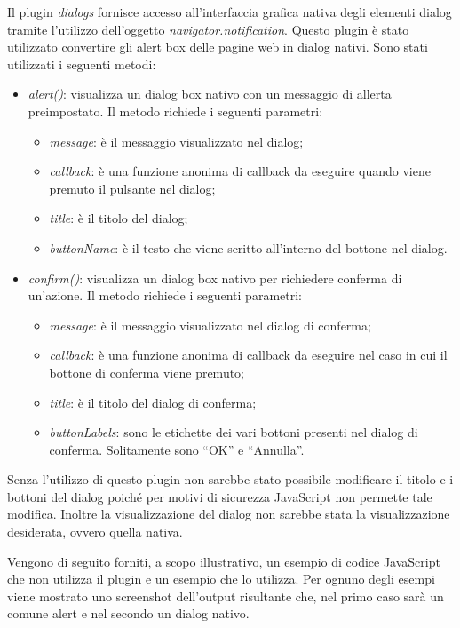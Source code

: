 Il plugin \textit{dialogs} fornisce accesso all'interfaccia grafica nativa degli elementi dialog tramite l'utilizzo dell'oggetto \textit{navigator.notification}. Questo plugin è stato utilizzato convertire gli alert box delle pagine web in dialog nativi. Sono stati utilizzati i seguenti metodi:
\begin{itemize}
	\item \textit{alert()}: visualizza un dialog box nativo con un messaggio di allerta preimpostato. Il metodo richiede i seguenti parametri:
	\begin{itemize}
		\item \textit{message}: è il messaggio visualizzato nel dialog;
		\item \textit{callback}: è una funzione anonima di callback da eseguire quando viene premuto il pulsante nel dialog;
		\item \textit{title}: è il titolo del dialog;
		\item \textit{buttonName}: è il testo che viene scritto all'interno del bottone nel dialog.
	\end{itemize}
	\item \textit{confirm()}: visualizza un dialog box nativo per richiedere conferma di un'azione. Il metodo richiede i seguenti parametri:
	\begin{itemize}
		\item \textit{message}: è il messaggio visualizzato nel dialog di conferma;
		\item \textit{callback}: è una funzione anonima di callback da eseguire nel caso in cui il bottone di conferma viene premuto;
		\item \textit{title}: è il titolo del dialog di conferma;
		\item \textit{buttonLabels}: sono le etichette dei vari bottoni presenti nel dialog di conferma. Solitamente sono ``OK'' e ``Annulla''.
	\end{itemize}
\end{itemize}

Senza l'utilizzo di questo plugin non sarebbe stato possibile modificare il titolo e i bottoni del dialog poiché per motivi di sicurezza JavaScript non permette tale modifica. Inoltre la visualizzazione del dialog non sarebbe stata la visualizzazione desiderata, ovvero quella nativa. 

Vengono di seguito forniti, a scopo illustrativo, un esempio di codice JavaScript che non utilizza il plugin e un esempio che lo utilizza. Per ognuno degli esempi viene mostrato uno screenshot dell'output risultante che, nel primo caso sarà un comune alert e nel secondo un dialog nativo.

